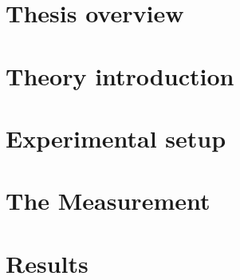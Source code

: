 \documentclass[11pt,notitlepage,twoside,BCOR=8.25mm,headsepline,numbers=noendperiod,DIV=14]{scrbook} %
\begin{document}


  \dominitoc[n]  

%


%

\tableofcontents



\linenumbers
  \mainmatter
  \part{Thesis overview}
  
  \part{Theory introduction}
  
  
  \part{Experimental setup}
  
  
  
  
  
  
  \part{The Measurement}
  
  
  
  
  
  
   \part{Results}
  

\end{document}

